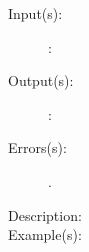 \begin{description}
\label{systemdict:XXX}
\item[{\stilop{--}{XXX}{--}}: ]
	\begin{description}\item[]
	\item[Input(s): ]
		\begin{description}\item[]
		\item[: ]
		\end{description}
	\item[Output(s): ]
		\begin{description}\item[]
		\item[: ]
		\end{description}
	\item[Errors(s): ]
		\begin{description}\item[]
		\item[.]
		\end{description}
	\item[Description: ]
	\item[Example(s): ]\begin{verbatim}


\end{verbatim}
\end{description}
\end{description}
